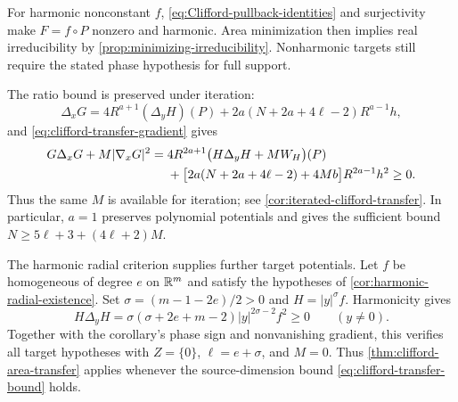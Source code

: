For harmonic nonconstant \(f\), \eqref{eq:Clifford-pullback-identities}
and surjectivity make \(F=f\circ P\) nonzero and harmonic.
Area minimization then implies real irreducibility by
\cref{prop:minimizing-irreducibility}. Nonharmonic targets still
require the stated phase hypothesis for full support.

The ratio bound is preserved under iteration:
\[
 \Delta_xG=4R^{a+1}(\Delta_yH)(P)
       +2a(N+2a+4\ell-2)R^{a-1}h,
\]
and \eqref{eq:clifford-transfer-gradient} gives
\begin{align}
 G\Delta_xG+M|\nabla_xG|^2
 ={}&4R^{2a+1}\bigl(H\Delta_yH+MW_H\bigr)(P)\notag\\
 &+\bigl[2a(N+2a+4\ell-2)+4Mb\bigr]R^{2a-1}h^2
 \geq0.
 \label{eq:clifford-transfer-ratio}
\end{align}
Thus the same \(M\) is available for iteration; see
\cref{cor:iterated-clifford-transfer}. In particular, \(a=1\)
preserves polynomial potentials and gives the sufficient bound
\(N\geq5\ell+3+(4\ell+2)M\).

The harmonic radial criterion supplies further target potentials.
Let \(f\) be homogeneous of degree \(e\) on \(\mathbb R^m\) and satisfy
the hypotheses of \cref{cor:harmonic-radial-existence}. Set
\(\sigma=(m-1-2e)/2>0\) and \(H=|y|^\sigma f\). Harmonicity gives
\[
 H\Delta_yH
 =\sigma(\sigma+2e+m-2)|y|^{2\sigma-2}f^2\geq0
 \qquad(y\ne0).
\]
Together with the corollary's phase sign and nonvanishing gradient,
this verifies all target hypotheses with \(Z=\{0\}\),
\(\ell=e+\sigma\), and \(M=0\). Thus
\cref{thm:clifford-area-transfer} applies whenever the source-dimension
bound \eqref{eq:clifford-transfer-bound} holds.
